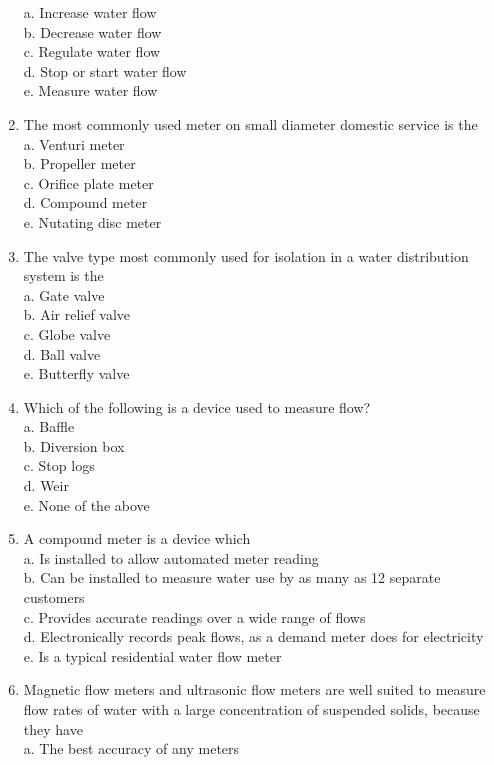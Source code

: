 \begin{enumerate}[1.]
a. Increase water flow\\
b. Decrease water flow\\
c. Regulate water flow\\
d. Stop or start water flow\\
e. Measure water flow\\
\item The most commonly used meter on small diameter domestic service is the\\
a. Venturi meter\\
b. Propeller meter\\
c. Orifice plate meter\\
d. Compound meter\\
e. Nutating disc meter\\
\item The valve type most commonly used for isolation in a water distribution system is the\\
a. Gate valve\\
b. Air relief valve\\
c. Globe valve\\
d. Ball valve\\
e. Butterfly valve\\
\item Which of the following is a device used to measure flow?\\
a. Baffle\\
b. Diversion box\\
c. Stop logs\\
d. Weir\\
e. None of the above\\
\item A compound meter is a device which\\
a. Is installed to allow automated meter reading\\
b. Can be installed to measure water use by as many as 12 separate customers\\
c. Provides accurate readings over a wide range of flows\\
d. Electronically records peak flows, as a demand meter does for electricity\\
e. Is a typical residential water flow meter\\
\item Magnetic flow meters and ultrasonic flow meters are well suited to measure flow rates of water with a large concentration of suspended solids, because they have\\
a. The best accuracy of any meters\\

\end{enumerate}
